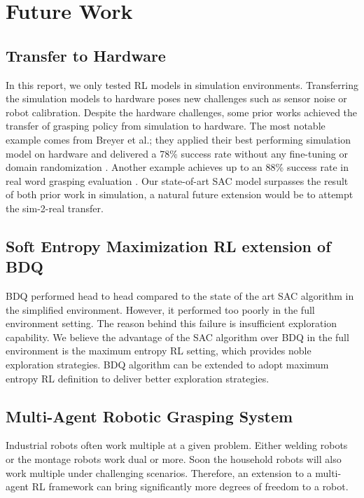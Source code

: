 \section{Future Work}

\subsection{Transfer to Hardware}
 
In this report, we only tested RL models in simulation environments. Transferring the simulation models to hardware poses new challenges such as sensor noise or robot calibration. Despite the hardware challenges, some prior works achieved the transfer of grasping policy from simulation to hardware. The most notable example comes from Breyer et al.; they applied their best performing simulation model on hardware and delivered a 78\% success rate without any fine-tuning or domain randomization \cite{Breyer2018}. Another example achieves up to an 88\% success rate in real word grasping evaluation \cite{Kalashnikov2018}. Our state-of-art SAC model surpasses the result of both prior work in simulation, a natural future extension would be to attempt the sim-2-real transfer.
 
\subsection{Soft Entropy Maximization RL extension of BDQ}
 
BDQ performed head to head compared to the state of the art SAC algorithm in the simplified environment. However, it performed too poorly in the full environment setting. The reason behind this failure is insufficient exploration capability. We believe the advantage of the SAC algorithm over BDQ in the full environment is the maximum entropy RL setting, which provides noble exploration strategies. BDQ algorithm can be extended to adopt maximum entropy RL definition to deliver better exploration strategies.
 
\subsection{Multi-Agent Robotic Grasping System}
 
Industrial robots often work multiple at a given problem. Either welding robots or the montage robots work dual or more. Soon the household robots will also work multiple under challenging scenarios. Therefore, an extension to a multi-agent RL framework can bring significantly more degrees of freedom to a robot. 
 

